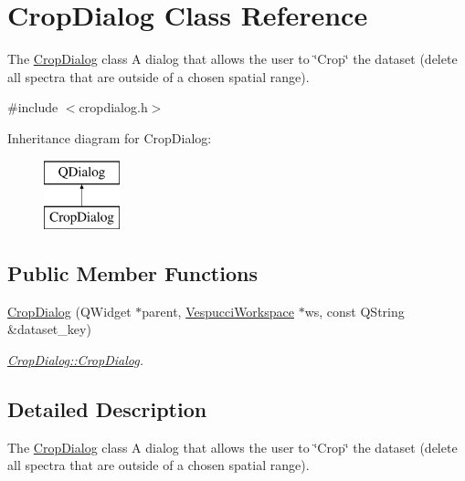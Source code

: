 \hypertarget{class_crop_dialog}{}\section{Crop\+Dialog Class Reference}
\label{class_crop_dialog}


The \hyperlink{class_crop_dialog}{Crop\+Dialog} class A dialog that allows the user to \char`\"{}\+Crop\char`\"{} the dataset (delete all spectra that are outside of a chosen spatial range).  




{\ttfamily \#include $<$cropdialog.\+h$>$}

Inheritance diagram for Crop\+Dialog\+:\begin{figure}[H]
\begin{center}
\leavevmode
\includegraphics[height=2.000000cm]{class_crop_dialog}
\end{center}
\end{figure}
\subsection*{Public Member Functions}
\begin{DoxyCompactItemize}
\item 
\hyperlink{class_crop_dialog_a1a60341394d5a870a34d30d9626d3efc}{Crop\+Dialog} (Q\+Widget $\ast$parent, \hyperlink{class_vespucci_workspace}{Vespucci\+Workspace} $\ast$ws, const Q\+String \&dataset\+\_\+key)
\begin{DoxyCompactList}\small\item\em \hyperlink{class_crop_dialog_a1a60341394d5a870a34d30d9626d3efc}{Crop\+Dialog\+::\+Crop\+Dialog}. \end{DoxyCompactList}\end{DoxyCompactItemize}


\subsection{Detailed Description}
The \hyperlink{class_crop_dialog}{Crop\+Dialog} class A dialog that allows the user to \char`\"{}\+Crop\char`\"{} the dataset (delete all spectra that are outside of a chosen spatial range). 

